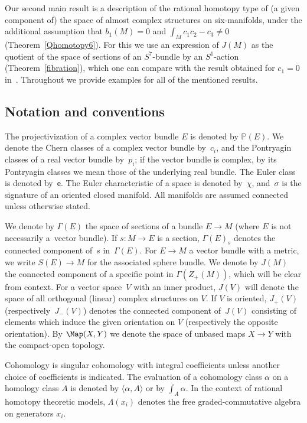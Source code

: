 Our second main result is a description of the rational homotopy type of (a given component of) the space of almost complex structures on six-manifolds, under the additional assumption that $b_1(M) = 0$ and $\int_M c_1c_2 - c_3 \neq 0$ (Theorem~\ref{Qhomotopy6}). For this we use an expression of $J(M)$ as the quotient of the space of sections of an $S^7$-bundle by an $S^1$-action (Theorem~\ref{fibration}), which one can compare with the result obtained for $c_1=0$ in~\cite[Proposition~5.1]{FGM21}.
Throughout we provide examples for all of the mentioned results.

\subsection*{Notation and conventions}

 The projectivization of a complex vector bundle $E$ is denoted by $\mathbb{P}(E)$. We denote the Chern classes of a complex vector bundle by~$c_i$, and the Pontryagin classes of a real vector bundle by~$p_i$; if the vector bundle is complex, by its Pontryagin classes we mean those of the underlying real bundle. The Euler class is denoted by~$\mathsf{e}$. The Euler characteristic of a space is denoted by~$\chi$, and~$\sigma$ is the signature of an oriented closed manifold. All manifolds are assumed connected unless otherwise stated.

We denote by $\Gamma(E)$ the space of sections of a bundle $E \to M$ (where $E$ is not necessarily a~vector bundle). If $s \colon M \to E$ is a section, $\Gamma(E)_s$ denotes the connected component of~$s$ in~$\Gamma(E)$.
For $E \to M$ a vector bundle with a metric, we write $S(E) \to M$ for the associated sphere bundle. We denote by $J(M)$ the connected component of a specific point in $\Gamma(Z_+(M))$, which will be clear from context. For a vector space~$V$ with an inner product, $J(V)$ will denote the space of all orthogonal (linear) complex structures on $V$. If $V$ is oriented, $J_+(V)$ (respectively~$J_-(V)$) denotes the connected component of~$J(V)$ consisting of elements which induce the given orientation on $V$ (respectively the opposite orientation). By $\Map(X,Y)$ we denote the space of unbased maps $X \to Y$ with the compact-open topology.

Cohomology is singular cohomology with integral coefficients unless another choice of coefficients is indicated. The evaluation of a cohomology class $\alpha$ on a homology class $A$ is denoted by $\langle \alpha, A \rangle$ or by $\int_A \alpha$. In the context of rational homotopy theoretic models, $\Lambda(x_i)$ denotes the free graded-commutative algebra on generators $x_i$.

